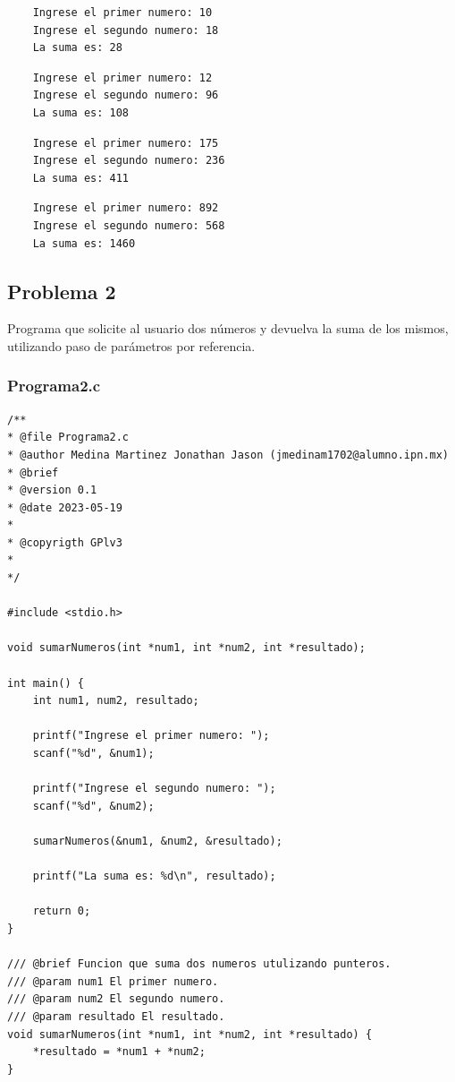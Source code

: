 \documentclass{article}
\begin{document}
	\begin{lstlisting}
	Ingrese el primer numero: 10
	Ingrese el segundo numero: 18
	La suma es: 28
	\end{lstlisting}
	
	\begin{lstlisting}
	Ingrese el primer numero: 12
	Ingrese el segundo numero: 96
	La suma es: 108
	\end{lstlisting}
	
	\begin{lstlisting}
	Ingrese el primer numero: 175
	Ingrese el segundo numero: 236
	La suma es: 411
	\end{lstlisting}
	
	\begin{lstlisting}
	Ingrese el primer numero: 892
	Ingrese el segundo numero: 568
	La suma es: 1460
	\end{lstlisting}
	
	\newpage
	
	\subsection{Problema 2}
	
	Programa que solicite al usuario dos números y devuelva la suma de los mismos, utilizando paso de parámetros por referencia.
	
	\subsubsection{Programa2.c}
	
	\begin{lstlisting}
/**
* @file Programa2.c
* @author Medina Martinez Jonathan Jason (jmedinam1702@alumno.ipn.mx)
* @brief 
* @version 0.1
* @date 2023-05-19
* 
* @copyrigth GPlv3
* 
*/

#include <stdio.h>

void sumarNumeros(int *num1, int *num2, int *resultado);

int main() {
	int num1, num2, resultado;
	
	printf("Ingrese el primer numero: ");
	scanf("%d", &num1);
	
	printf("Ingrese el segundo numero: ");
	scanf("%d", &num2);
	
	sumarNumeros(&num1, &num2, &resultado);
	
	printf("La suma es: %d\n", resultado);
	
	return 0;
}

/// @brief Funcion que suma dos numeros utulizando punteros.
/// @param num1 El primer numero.
/// @param num2 El segundo numero.
/// @param resultado El resultado.
void sumarNumeros(int *num1, int *num2, int *resultado) {
	*resultado = *num1 + *num2;
}
	\end{lstlisting}
	
\end{document}
